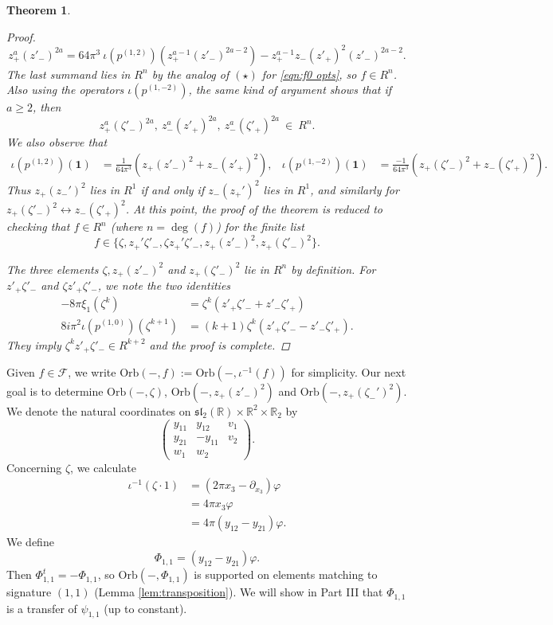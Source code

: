 \documentclass[reqno, 11pt]{amsart} %
\numberwithin{equation}{section}
\theoremstyle{plain}
\newtheorem{theorem}{Theorem}[section]
\theoremstyle{definition}
\theoremstyle{remark}
\newcommand{\mbR}{\mathbb{R}}
\newcommand{\mcF}{\mathcal{F}}
\newcommand{\mfl}{\mathfrak{l}}
\newcommand{\mfs}{\mathfrak{s}}
\newcommand{\mfsl}{\mfs\mfl}
\newcommand{\Orb}{\mathrm{Orb}}
\begin{document}
\begin{theorem}
\begin{proof}
$$
z_+^{a} (z'_-)^{2a} = 64 \pi^3 \ \iota(p^{(1,2)}) \left( z_+^{a-1} (z'_-)^{2a - 2} \right)  - z_+^{a-1} z_- (z'_+)^2 (z'_-)^{2a-2}.
$$
The last summand lies in $R^n$ by the analog of $(\star)$ for \eqref{eqn:f0 opts}, so $f\in R^n$.
Also using the operators $\iota(p ^{(1, -2)})$, the same kind of argument shows that if $a \geq 2$, then
\[
z_+^{a}(\zeta'_-)^{2a}, \ z_-^a(z'_+)^{2a}, \ z_-^a(\zeta'_+)^{2a} \ \in \ R^n.
\]
We also observe that
\begin{align*}
\iota(p^{(1,2)})(\mathbf 1) &= \frac{1}{64 \pi^3} ( z_+(z'_-)^2 + z_-(z'_+)^2),  & \iota(p^{(1,-2)}) (\mathbf 1) &= \frac{-1}{64 \pi^3} ( z_+(\zeta'_-)^2 + z_-(\zeta'_+)^2).
\end{align*}
Thus $z_+(z_-')^2$ lies in $R^1$ if and only if $z_-(z_+')^2$ lies in $R^1$, and similarly for $z_+(ζ'_-)^2 \leftrightarrow z_-(ζ'_+)^2$. At this point, the proof of the theorem is reduced to checking that $f\in R^n$ (where $n = \deg(f)$) for the finite list
\[
f \in \{  \zeta, z_+'\zeta'_-, \zeta z_+' \zeta'_-, z_+(z'_-)^2, z_+(\zeta'_-)^2 \}.
\]

The three elements $\zeta,  z_+(z'_-)^2$ and $z_+(\zeta'_-)^2 $ lie in $R^n$ by definition. For $z'_+ζ'_-$ and $ζz'_+ζ'_-$, we note the two identities
\begin{align*}
-8πξ_1(ζ^k) & = ζ^k(z'_+ζ'_- + z'_-ζ'_+)\\
8iπ^2 ι(p^{(1, 0)})(ζ^{k+1}) & = (k+1)ζ^k(z'_+ζ'_- - z'_-ζ'_+).
\end{align*}
They imply $ζ^kz'_+ζ'_- \in R^{k+2}$ and the proof is complete.
\end{proof}
\end{theorem}

Given $f\in \mcF$, we write $\Orb(-,f) := \Orb(-,ι^{-1}(f))$ for simplicity. Our next goal is to determine $\Orb(-,ζ)$, $\Orb(-,z_+(z'_-)^2)$ and $\Orb(-,z_+(ζ_-')^2)$. We denote the natural coordinates on $\mfsl_2(\mbR)\times \mbR^2\times \mbR_2$ by
\begin{equation}\label{eq:nat_coords}
\begin{pmatrix}
y_{11} & y_{12} & v_1\\
y_{21} & -y_{11} & v_2\\
w_1 & w_2 &
\end{pmatrix}.
\end{equation}
Concerning $ζ$, we calculate
\begin{equation}\label{eq:zeta_explicit}
\begin{aligned}
ι^{-1}(ζ\cdot 1) & = (2πx_3 - \partial_{x_3})φ\\
& = 4πx_3φ\\
& = 4π(y_{12} - y_{21}) φ.
\end{aligned}
\end{equation}
We define
\begin{equation}\label{eq:def_Phi_11}
Φ_{1,1} = (y_{12} - y_{21})φ.
\end{equation}
Then $Φ_{1,1}^t = -Φ_{1,1}$, so $\Orb(-,Φ_{1,1})$ is supported on elements matching to signature $(1,1)$ (Lemma \ref{lem:transposition}). We will show in Part III that $Φ_{1,1}$ is a transfer of $ψ_{1,1}$ (up to constant).
\end{document}
